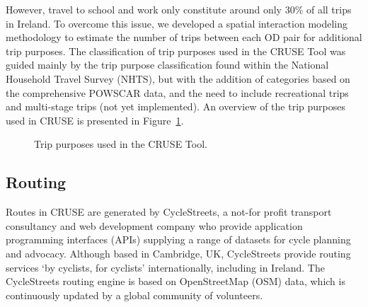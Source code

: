 \documentclass[
  super,
  preprint,
  3p]{elsarticle}
\begin{document}
However, travel to school and work only constitute around only 30\% of
all trips in Ireland. To overcome this issue, we developed a spatial
interaction modeling methodology to estimate the number of trips between
each OD pair for additional trip purposes. The classification of trip
purposes used in the CRUSE Tool was guided mainly by the trip purpose
classification found within the National Household Travel Survey (NHTS),
but with the addition of categories based on the comprehensive POWSCAR
data, and the need to include recreational trips and multi-stage trips
(not yet implemented). An overview of the trip purposes used in CRUSE is
presented in Figure~\ref{fig-trip-purposes}.

\begin{figure}


\caption{\label{fig-trip-purposes}Trip purposes used in the CRUSE Tool.}

\end{figure}%

\subsection{Routing}\label{routing}

Routes in CRUSE are generated by CycleStreets, a not-for profit
transport consultancy and web development company who provide
application programming interfaces (APIs) supplying a range of datasets
for cycle planning and advocacy. Although based in Cambridge, UK,
CycleStreets provide routing services `by cyclists, for cyclists'
internationally, including in Ireland. The CycleStreets routing engine
is based on OpenStreetMap (OSM) data, which is continuously updated by a
global community of volunteers.
\end{document}
